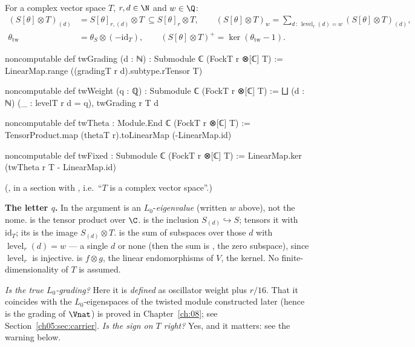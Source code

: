\begin{definition}\label{ch05:def:tw}
For a complex vector space $T$, $r,d\in\N$ and $w\in\Q$:
\begin{align*}
  (S[\theta]\otimes T)_{(d)} &= S[\theta]_{r,(d)}\otimes T \ \subseteq S[\theta]_r\otimes T,\qquad
  (S[\theta]\otimes T)_{w} = \textstyle\sum_{d\,:\,\operatorname{level}_r(d) = w}(S[\theta]\otimes T)_{(d)},\\
  \theta_{\mathrm{tw}} &= \theta_S\otimes(-\mathrm{id}_T),\qquad
  (S[\theta]\otimes T)^+ = \ker(\theta_{\mathrm{tw}} - 1).
\end{align*}
\end{definition}
\begin{leancode}
noncomputable def twGrading (d : ℕ) : Submodule ℂ (FockT r ⊗[ℂ] T) :=
  LinearMap.range ((gradingT r d).subtype.rTensor T)

noncomputable def twWeight (q : ℚ) : Submodule ℂ (FockT r ⊗[ℂ] T) :=
  ⨆ (d : ℕ) (_ : levelT r d = q), twGrading r T d

noncomputable def twTheta : Module.End ℂ (FockT r ⊗[ℂ] T) :=
  TensorProduct.map (thetaT r).toLinearMap (-LinearMap.id)

noncomputable def twFixed : Submodule ℂ (FockT r ⊗[ℂ] T) :=
  LinearMap.ker (twTheta r T - LinearMap.id)
\end{leancode}
(, in a section with , i.e.\ ``$T$ is a complex vector space''.)
\begin{dictionary}
\textbf{The letter $q$.} In  the argument  is an $L_0$-\emph{eigenvalue}
(written $w$ above), not the nome.  is the tensor product over $\C$.
 is the inclusion $S_{(d)}\hookrightarrow S$;  tensors it
with $\mathrm{id}_T$; its  is the image $S_{(d)}\otimes T$.  is the sum of subspaces over those $d$ with $\operatorname{level}_r(d) = w$ --- a single $d$ or
none (then the sum is , the zero subspace), since $\operatorname{level}_r$ is injective.
 is $f\otimes g$,  the linear endomorphisms of $V$,
 the kernel. No finite-dimensionality of $T$ is assumed.

\emph{Is  the true $L_0$-grading?} Here it is \emph{defined} as oscillator weight plus
$r/16$. That it coincides with the $L_0$-eigenspaces of the twisted module constructed later (hence is
the grading of $\Vnat$) is proved in Chapter~\ref{ch:08}; see Section~\ref{ch05:sec:carrier}.
\emph{Is the sign on $T$ right?} Yes, and it matters: see the warning below.
\end{dictionary}

